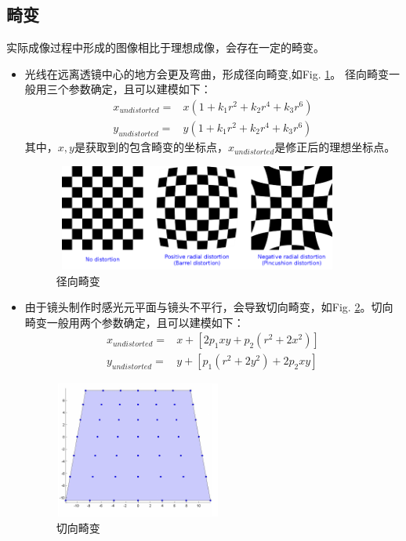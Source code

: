 \documentclass[UTF8]{ctexart}
\begin{document}
\begin{CJK*}{UTF8}{gbsn}
\subsection{畸变}
实际成像过程中形成的图像相比于理想成像，会存在一定的畸变。
\begin{itemize}
    \item 
        光线在远离透镜中心的地方会更及弯曲，形成径向畸变,如Fig. \ref{fig:dis1}。
        径向畸变一般用三个参数确定，且可以建模如下：
        \begin{equation}
            \label{eq:dis1}
            \begin{aligned}
                x_{undistorted} =& x( 1 + k_1 r^2 + k_2 r^4 + k_3 r^6) \\ 
                y_{undistorted} =& y( 1 + k_1 r^2 + k_2 r^4 + k_3 r^6)
            \end{aligned}
        \end{equation}
        其中，$x,y$是获取到的包含畸变的坐标点，$x_{undistorted}$是修正后的理想坐标点。
        \begin{figure}[htbp]
            \centering
            \includegraphics[height=3.5cm,width=9.5cm]{3.png}
            \caption{径向畸变}
            \label{fig:dis1}
        \end{figure}
    \item
        由于镜头制作时感光元平面与镜头不平行，会导致切向畸变，如Fig. \ref{fig:dis2}。切向畸变一般用两个参数确定，且可以建模如下：
        \begin{equation}
            \label{eq:dis2}
            \begin{aligned}
                x_{undistorted} =& x + [ 2p_1xy + p_2(r^2+2x^2)] \\ 
                y_{undistorted} =& y + [ p_1(r^2+ 2y^2)+ 2p_2xy]
            \end{aligned}
        \end{equation}
        \begin{figure}[htbp]
            \centering
            \includegraphics[height=4.5cm,width=5.5cm]{5.png}
            \caption{切向畸变}
            \label{fig:dis2}
        \end{figure}
\end{itemize}




\end{CJK*}
\end{document}
